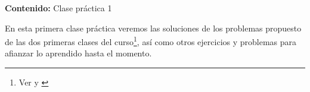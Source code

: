 
    {\Large
    \textbf{Contenido:} Clase práctica 1
}

En esta primera clase práctica veremos las soluciones de los 
problemas propuesto de las dos primeras clases del curso\footnote{Ver \cite{TD23-clase1} y \cite{TD23-clase2}},
así como otros ejercicios y problemas para afianzar lo aprendido hasta el momento.